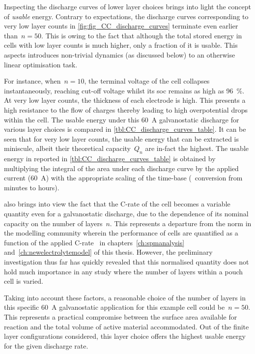 Inspecting the  discharge curves of  lower layer  choices brings into  light the
concept of \emph{usable} energy. Contrary  to expectations, the discharge curves
corresponding  to very  low layer  counts in  \cref{fig:fig_CC_discharge_curves}
terminate even earlier than~${n=50}$. This is  owing to the fact that although the
total  stored energy  in cells  with low  layer counts  is much  higher, only  a
fraction  of it  is usable.  This  aspects introduces  non-trivial dynamics  (as
discussed below) to an otherwise linear optimisation task.

For  instance,  when~${n  =  10}$,  the terminal  voltage  of  the cell  collapses
instantaneously, reaching cut-off  voltage whilst its \gls{soc}  remains as high
as \SI{96}{\percent}. At very low layer  counts, the thickness of each electrode
is high. This presents a high resistance  to the flow of charges thereby leading
to  high overpotential  drops  within the  cell. The  usable  energy under  this
\SI{60}{\ampere} galvanostatic  discharge for various layer  choices is compared
in \cref{tbl:CC_discharge_curves_table}. It can be  seen that for very low layer
counts,  the usable  energy that  can be  extracted is  miniscule, albeit  their
theoretical  capacity~$Q_n$  are  in-fact  the highest.  The  usable  energy  in
\SI{}{\watthour} reported in \cref{tbl:CC_discharge_curves_table} is obtained by
multiplying the integral  of the area under each discharge  curve by the applied
current  (\SI{60}{\ampere})  with  the  appropriate  scaling  of  the  time-base
(\ie~conversion from minutes to hours).



  also brings  into view  the fact  that the
\mbox{C-rate} of the  cell becomes a variable quantity even  for a galvanostatic
discharge,  due to  the dependence  of  its nominal  capacity on  the number  of
layers~$n$. This represents a departure from the norm in the modelling community
wherein the  performance of cells  are quantified as  a function of  the applied
C-rate  \eg~in  chapters~\ref{ch:spmanalysis} and~\ref{ch:newelectrolytemodel}
of  this thesis.  However, the  preliminary investigation  thus far  has quickly
revealed that  this normalised  quantity does  not hold  much importance  in any
study where the number of layers within a pouch cell is varied.

Taking into account  these factors, a reasonable choice of  the number of layers
in  this specific  \SI{60}{\ampere} galvanostatic  application for  this example
cell  could  be~${n=50}$.  This  represents  a  practical compromise  between  the
surface area  available for  reaction and  the total  volume of  active material
accommodated.  Out of  the finite  layer configurations  considered, this  layer
choice offers the highest usable energy for the given discharge rate.

